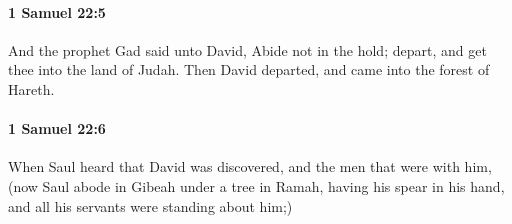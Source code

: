 		\paragraph{1 Samuel 22:5} %
			\label{1SAMUEL-22-5}

			And the prophet Gad said unto David, Abide not in the hold; depart, and get thee into the land of Judah. Then David departed, and came into the forest of Hareth.


		\paragraph{1 Samuel 22:6} %
			\label{1SAMUEL-22-6}

			When Saul heard that David was discovered, and the men that were with him, (now Saul abode in Gibeah under a tree in Ramah, having his spear in his hand, and all his servants were standing about him;)


